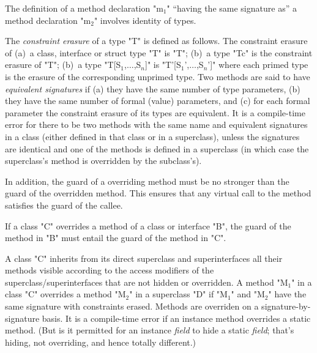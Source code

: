 The definition of a method declaration \xcdmath"m$_1$" ``having the same signature
as'' a method declaration \xcdmath"m$_2$" involves identity of types. 


The {\em constraint erasure} of a type \xcdmath"T" is defined as follows.
The constraint erasure of  (a)~a class, interface or struct type \xcdmath"T" is 
\xcdmath"T"; (b)~a type \xcdmath"T{c}" is the constraint erasure of 
\xcdmath"T"; (b)~a type \xcdmath"T[S$_1$,$\ldots$,S$_n$]" 
is \xcdmath"T'[S$_1$',$\ldots$,S$_n$']" where each primed type is the erasure of 
the corresponding unprimed type.
 Two methods are said to have {\em equivalent signatures} if (a) they have the
 same number of type parameters, 
(b) they have the same number of formal (value) parameters, and (c)
for each formal parameter the constraint erasure of its types are equivalent.
It is a 
compile-time error for there to be two methods with the same name and
equivalent signatures in a class (either defined in that class or in a
superclass), unless the signatures are identical and one of the methods is
defined in a superclass (in which case the superclass's method is overridden
by the subclass's).

 



In addition, the guard of a overriding method must be 
no stronger than the guard of the overridden method.   This
ensures that any virtual call to the method
satisfies the guard of the callee.


  If a class \xcd"C" overrides a method of a class or interface
  \xcd"B", the guard of the method in \xcd"B" must entail
  the guard of the method in \xcd"C".


A class \xcd"C" inherits from its direct superclass and superinterfaces all
their methods visible according to the access modifiers
of the superclass/superinterfaces that are not hidden or overridden. A method \xcdmath"M$_1$" in a class
\xcd"C" overrides
a method \xcdmath"M$_2$" in a superclass \xcd"D" if
\xcdmath"M$_1$" and \xcdmath"M$_2$" have the same signature with constraints erased.
Methods are overriden on a signature-by-signature basis.  It is a compile-time
error if an instance method overrides a static method.  (But is it permitted
for an instance {\em field} to hide a static {\em field}; that's hiding, not
overriding, and hence totally different.)

